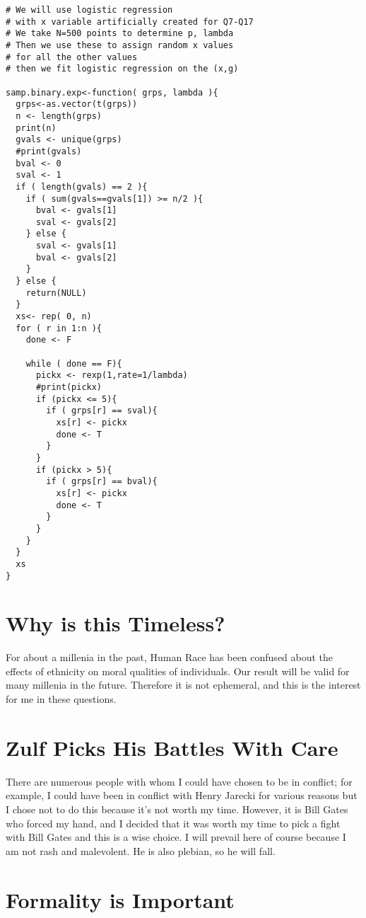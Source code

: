 \documentclass{amsart}
\begin{document}
\begin{verbatim}
# We will use logistic regression
# with x variable artificially created for Q7-Q17
# We take N=500 points to determine p, lambda
# Then we use these to assign random x values
# for all the other values
# then we fit logistic regression on the (x,g)

samp.binary.exp<-function( grps, lambda ){
  grps<-as.vector(t(grps))
  n <- length(grps)
  print(n)
  gvals <- unique(grps)
  #print(gvals)
  bval <- 0
  sval <- 1
  if ( length(gvals) == 2 ){
    if ( sum(gvals==gvals[1]) >= n/2 ){
      bval <- gvals[1]
      sval <- gvals[2]
    } else {
      sval <- gvals[1]
      bval <- gvals[2]
    }
  } else {
    return(NULL)
  }
  xs<- rep( 0, n)
  for ( r in 1:n ){
    done <- F
    
    while ( done == F){
      pickx <- rexp(1,rate=1/lambda)
      #print(pickx)
      if (pickx <= 5){
        if ( grps[r] == sval){
          xs[r] <- pickx
          done <- T
        }  
      }
      if (pickx > 5){
        if ( grps[r] == bval){
          xs[r] <- pickx
          done <- T
        }  
      }
    }
  }
  xs
}
\end{verbatim}

\section{Why is this Timeless?}

For about a millenia in the past, Human Race has been confused about the effects of ethnicity on moral qualities of individuals.  Our result will be valid for many millenia in the future.  Therefore it is not ephemeral, and this is the interest for me in these questions.

\section{Zulf Picks His Battles With Care}

There are numerous people with whom I could have chosen to be in conflict; for example, I could have been in conflict with Henry Jarecki for various reasons but I chose not to do this because it's not worth my time.  However, it is Bill Gates who forced my hand, and I decided that it was worth my time to pick a fight with Bill Gates and this is a wise choice.  I will prevail here of course because I am not rash and malevolent.  He is also plebian, so he will fall.

\section{Formality is Important}
\end{document}
